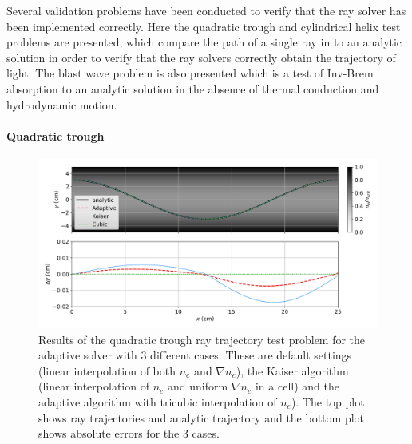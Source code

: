 Several validation problems have been conducted to verify that the ray solver has been implemented correctly.
Here the quadratic trough and cylindrical helix test problems are presented, which compare the path of a single ray in to an analytic solution in order to verify that the ray solvers correctly obtain the trajectory of light.
The blast wave problem is also presented which is a test of \ac{Inv-Brem} absorption to an analytic solution in the absence of thermal conduction and hydrodynamic motion.

\paragraph*{Quadratic trough}

\begin{figure}[t!]
    \includegraphics[width=\linewidth]{Numerics/Images/Quadtrough.png}
    \centering
    \caption{Results of the quadratic trough ray trajectory test problem for the adaptive solver with 3 different cases.
    These are default settings (linear interpolation of both $n_e$ and $\nabla n_e$), the Kaiser algorithm (linear interpolation of $n_e$ and uniform $\nabla n_e$ in a cell) and the adaptive algorithm with tricubic interpolation of $n_e$).
    The top plot shows ray trajectories and analytic trajectory and the bottom plot shows absolute errors for the 3 cases.}%
    \label{fig:SOLAS_quadtrough}
\end{figure}

